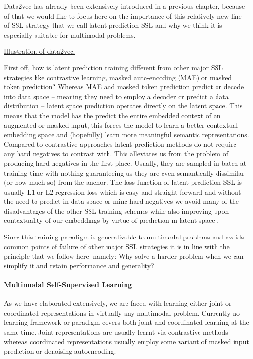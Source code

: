 \documentclass[
]{krantz}
\begin{document}
Data2vec \citep{baevski2022data2vec} has already been extensively introduced in a previous chapter, because of that we would like to focus here on the importance of this relatively new line of SSL strategy that we call latent prediction SSL and why we think it is especially suitable for multimodal problems.

\href{figures/03-01/data2vec.png}{Illustration of data2vec\citep{baevski2022data2vec}.}

First off, how is latent prediction training different from other major SSL strategies like contrastive learning, masked auto-encoding (MAE) or masked token prediction? Whereas MAE and masked token prediction predict or decode into data space -- meaning they need to employ a decoder or predict a data distribution -- latent space prediction operates directly on the latent space. This means that the model has the predict the entire embedded context of an augmented or masked input, this forces the model to learn a better contextual embedding space and (hopefully) learn more meaningful semantic representations. Compared to contrastive approaches latent prediction methods do not require any hard negatives to contrast with. This alleviates us from the problem of producing hard negatives in the first place. Usually, they are sampled in-batch at training time with nothing guaranteeing us they are even semantically dissimilar (or how much so) from the anchor. The loss function of latent prediction SSL is usually L1 or L2 regression loss which is easy and straight-forward and without the need to predict in data space or mine hard negatives we avoid many of the disadvantages of the other SSL training schemes while also improving upon contextuality of our embeddings by virtue of prediction in latent space \citep{baevski2022data2vec}.

Since this training paradigm is generalizable to multimodal problems and avoids common points of failure of other major SSL strategies it is in line with the principle that we follow here, namely: Why solve a harder problem when we can simplify it and retain performance and generality?

\hypertarget{multimodal-self-supervised-learning}{%
\paragraph{Multimodal Self-Supervised Learning}\label{multimodal-self-supervised-learning}}

As we have elaborated extensively, we are faced with learning either joint or coordinated representations in virtually any multimodal problem. Currently no learning framework or paradigm covers both joint and coordinated learning at the same time. Joint representations are usually learnt via contrastive methods whereas coordinated representations usually employ some variant of masked input prediction or denoising autoencoding.
\end{document}
